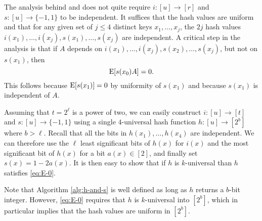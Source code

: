 The analysis behind  and  does not quite
require $i:[u]\to[r]$ and $s:[u]\to\{-1,1\}$ to be independent.
It suffices that the hash values are uniform and that for any
given set of $j\leq 4$ distinct keys $x_1,\ldots,x_j$, the $2j$ hash
values $i(x_1),\ldots,i(x_j),s(x_1),\ldots,s(x_j)$ are independent.
A critical step in the analysis is that if
$A$ depends on $i(x_1),\ldots,i(x_j),s(x_2),\ldots,s(x_j)$, but
not on $s(x_1)$, then
\begin{equation}\label{eq:E-0}
  \operatorname*{E}[s(x_0) A] = 0 .
\end{equation}
This follows because $\operatorname*{E}[s(x_1)]=0$ by uniformity of $s(x_1)$ and because $s(x_1)$ is independent of $A$.


Assuming that $t=2^\ell$ is a power of two, we can easily construct
$i:[u]\to[t]$ and $s:[u]\to\{-1,1\}$ using a single $4$-universal
hash function $h:[u]\to[2^b]$ where $b>\ell$. Recall that all the bits in
$h(x_1),\ldots,h(x_4)$ are independent. We can therefore use the
$\ell$ least significant bits of $h(x)$ for $i(x)$ and the most
significant bit of $h(x)$ for a bit $a(x)\in[2]$, and finally set
$s(x)=1-2a(x)$. It is then easy to show that if $h$ is $k$-universal
than $h$ satisfies \cref{eq:E-0}.
Note that Algorithm \ref{alg:h-and-s} is well defined as long as 
$h$ returns a $b$-bit integer. However, \cref{eq:E-0} requires
that $h$ is $k$-universal into $[2^b]$, which in particular implies that
the hash values are uniform in $[2^b]$.


